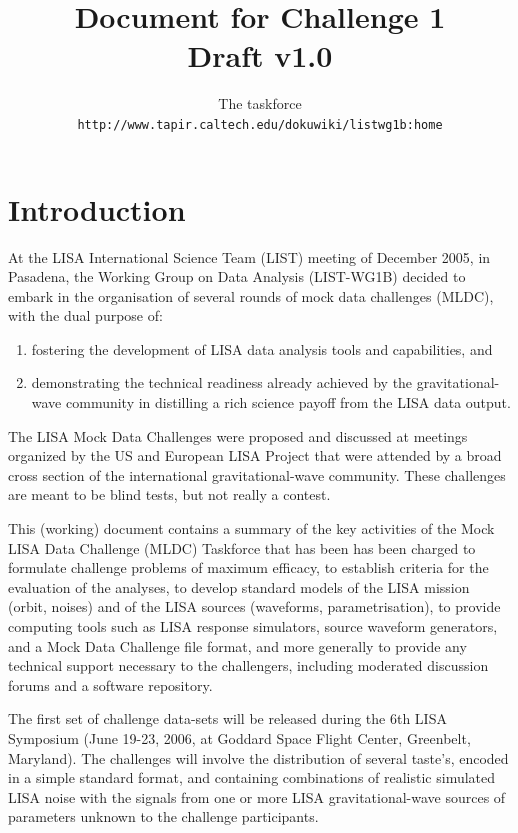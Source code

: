 \documentclass[11pt]{report}
\begin{document}
\title{\bf Document for Challenge 1\\
Draft v1.0}

\author{The taskforce\\
{\tt http://www.tapir.caltech.edu/dokuwiki/listwg1b:home}
}

\maketitle

\chapter{Introduction}

At the LISA International Science Team (LIST) meeting of December 2005, in Pasadena, the Working Group on Data Analysis (LIST-WG1B) decided to embark in the organisation of several rounds of mock data challenges (MLDC), with the dual purpose of:
\begin{enumerate}
\item fostering the development of LISA data analysis tools and capabilities, and 
\item demonstrating the technical readiness already achieved by the gravitational-wave community in distilling a rich science payoff from the LISA data output.
\end{enumerate}
 The LISA Mock Data Challenges were proposed and discussed at meetings organized by the US and European LISA Project that were attended by a broad cross section of the international gravitational-wave community. These challenges are meant to be blind tests, but not really a contest.

This (working) document contains a summary of the key activities of the Mock LISA Data Challenge (MLDC) Taskforce that has been has been charged to formulate challenge problems of maximum efficacy, to establish criteria for the evaluation of the analyses, to develop standard models of the LISA mission (orbit, noises) and of the LISA sources (waveforms, parametrisation), to provide computing tools such as LISA response simulators, source waveform generators, and a Mock Data Challenge file format, and more generally to provide any technical support necessary to the challengers, including moderated discussion forums and a software repository. 

The first set of challenge data-sets will be released during the 6th LISA Symposium (June 19-23, 2006, at Goddard Space Flight Center, Greenbelt, Maryland). The challenges will involve the distribution of several taste's, encoded in a simple standard format, and containing combinations of realistic simulated LISA noise with the signals from one or more LISA gravitational-wave sources of parameters unknown to the challenge participants.
\end{document}
